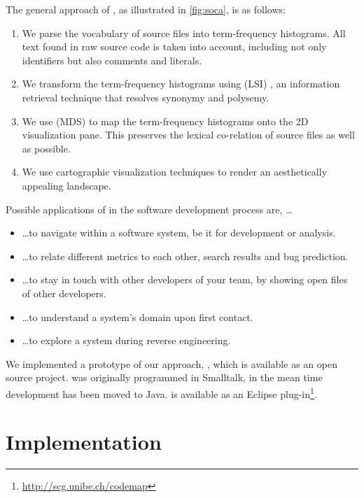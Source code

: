 The general approach of \SOCA, as illustrated in \autoref{fig:soca}, is as follows:
\begin{enumerate}
\item We parse the vocabulary of source files into term-frequency histograms. All text found in raw source code is taken into account, including not only identifiers but also comments and literals.
\item We transform the term-frequency histograms using \LSI (LSI) \cite{Deer90a}, an information retrieval technique that resolves synonymy and polysemy. 
\item We use \MDS (MDS) \cite{Borg05a} to map the term-frequency histograms onto the 2D visualization pane. This preserves the lexical co-relation of source files as well as possible.
\item We use cartographic visualization techniques to render an aesthetically appealing landscape.
\end{enumerate}

Possible applications of \SOCA in the software development process are, \dots

\begin{itemize}
\item \dots to navigate within a software system, be it for development or analysis.
\item \dots to relate different metrics to each other, \eg search results and bug prediction.
\item \dots to stay in touch with other developers of your team, by showing open files of other developers.
\item \dots to understand a system’s domain upon first contact.
\item \dots to explore a system during reverse engineering.
\end{itemize}

\noindent We implemented a prototype of our approach, \TOOL, which is available as an open source project. \TOOL was originally programmed in Smalltalk, in the mean time development has been moved to Java. \TOOL is available as an Eclipse plug-in\footnote{\url{http://scg.unibe.ch/codemap}}.

\section{Implementation}

